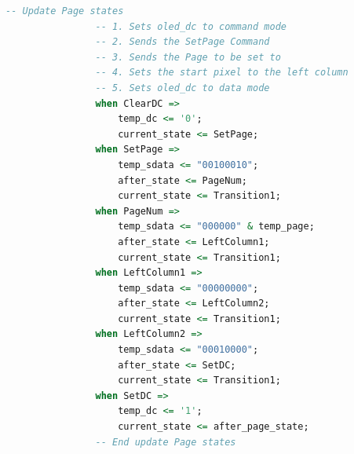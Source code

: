 \documentclass[a4paper,12pt]{article}
\begin{document}
\begin{lstlisting}[language=VHDL, caption={\texttt{oled\_ex.vhd}: demo de OLED adaptado para mostrar A, B y A+B en la primera línea.}]
                -- Update Page states
                -- 1. Sets oled_dc to command mode
                -- 2. Sends the SetPage Command
                -- 3. Sends the Page to be set to
                -- 4. Sets the start pixel to the left column
                -- 5. Sets oled_dc to data mode
                when ClearDC =>
                    temp_dc <= '0';
                    current_state <= SetPage;
                when SetPage =>
                    temp_sdata <= "00100010";
                    after_state <= PageNum;
                    current_state <= Transition1;
                when PageNum =>
                    temp_sdata <= "000000" & temp_page;
                    after_state <= LeftColumn1;
                    current_state <= Transition1;
                when LeftColumn1 =>
                    temp_sdata <= "00000000";
                    after_state <= LeftColumn2;
                    current_state <= Transition1;
                when LeftColumn2 =>
                    temp_sdata <= "00010000";
                    after_state <= SetDC;
                    current_state <= Transition1;
                when SetDC =>
                    temp_dc <= '1';
                    current_state <= after_page_state;
                -- End update Page states


\end{lstlisting}
\end{document}
